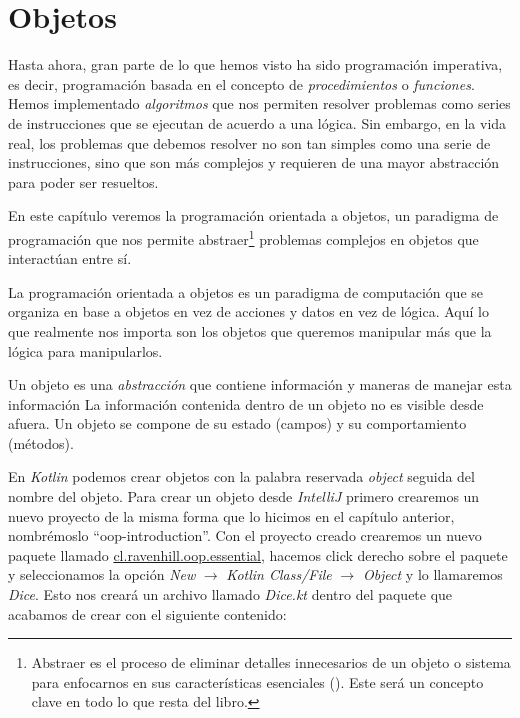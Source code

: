 \section{Objetos}
  Hasta ahora, gran parte de lo que hemos visto ha sido programación imperativa, es decir,
  programación basada en el concepto de \textit{procedimientos} o \textit{funciones}.
  Hemos implementado \textit{algoritmos} que nos permiten resolver problemas como series de
  instrucciones que se ejecutan de acuerdo a una lógica.
  Sin embargo, en la vida real, los problemas que debemos resolver no son tan simples como
  una serie de instrucciones, sino que son más complejos y requieren de una mayor abstracción
  para poder ser resueltos.

  En este capítulo veremos la programación orientada a objetos, un paradigma de programación
  que nos permite abstraer\footnote{
    Abstraer es el proceso de eliminar detalles innecesarios de un objeto o sistema para 
    enfocarnos en sus características esenciales (\cite{ObjectorientedProgramming2023}).
    Este será un concepto clave en todo lo que resta del libro.
  } problemas complejos en objetos que interactúan entre sí.

  \begin{defaultbox}
    La programación orientada a objetos es un paradigma de computación que se organiza en base a 
    objetos en vez de acciones y datos en vez de lógica.
    Aquí lo que realmente nos importa son los objetos que queremos manipular más que la lógica para
    manipularlos.
  \end{defaultbox}
  
  Un objeto es una \textit{abstracción} que contiene información y maneras de manejar esta información
  La información contenida dentro de un objeto no es visible desde afuera.
  Un objeto se compone de su estado (campos) y su comportamiento (métodos).

  En \textit{Kotlin} podemos crear objetos con la palabra reservada \textit{object} seguida del 
  nombre del objeto.
  Para crear un objeto desde \textit{IntelliJ} primero crearemos un nuevo proyecto de la misma forma
  que lo hicimos en el capítulo anterior, nombrémoslo \enquote{oop-introduction}.
  Con el proyecto creado crearemos un nuevo paquete llamado \url{cl.ravenhill.oop.essential}, 
  hacemos click derecho sobre el paquete y seleccionamos la opción \textit{New} \(\rightarrow\) 
  \textit{Kotlin Class/File} \(\rightarrow\) \textit{Object} y lo llamaremos \textit{Dice}.
  Esto nos creará un archivo llamado \textit{Dice.kt} dentro del paquete que acabamos de crear con
  el siguiente contenido:

